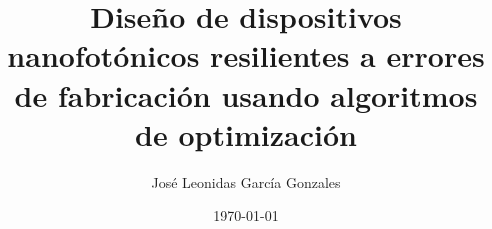 \documentclass[a4paper, 12pt, oneside]{tesisutec}
\begin{document}
\frontmatter
{}

\title{Diseño de dispositivos nanofotónicos resilientes a errores de fabricación usando algoritmos de
optimización}
\author{José Leonidas García Gonzales}
\date{\today}

\maketitle
{}

%
%
%

\tableofcontents
\newpage
\listoftables
\newpage
\listoffigures


\mainmatter
\pagestyle{fancy}

%
%
%

%
%
%
%
%


\renewcommand{\bibname}{\large\bf{REFERENCIAS BIBLIOGRÁFICAS}}
\end{document}

